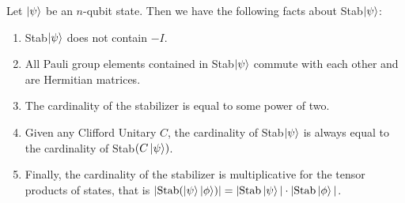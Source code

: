 \documentclass[12pt]{dalthesis}
\begin{document}
\begin{proposition}
\label{stabilizerfacts}
Let $\ket{\psi}$ be an $n$-qubit state. Then we have the following facts about Stab$\ket{\psi}$:
\begin{enumerate}
\item Stab$\ket{\psi}$ does not contain $-I$.
\item All Pauli group elements contained in Stab$\ket{\psi}$ commute with each other and are Hermitian matrices.
\item The cardinality of the stabilizer is equal to some power of two.
\item Given any Clifford Unitary $C$, the cardinality of Stab$\ket{\psi}$ is always equal to the cardinality of Stab$(C \ket{\psi})$.
\item Finally, the cardinality of the stabilizer is multiplicative for the tensor products of states, that is $| \text{Stab} (\ket{\psi} \ket{\phi})| = |\text{Stab}\ket{\psi}| \cdot |\text{Stab}\ket{\phi}|$. 
\end{enumerate}
\end{proposition}
\end{document}
